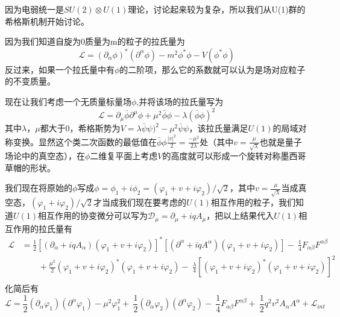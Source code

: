 因为电弱统一是$SU(2)\otimes U(1)$理论，讨论起来较为复杂，所以我们从U(1)群的希格斯机制开始讨论。

因为我们知道自旋为0质量为m的粒子的拉氏量为
\begin{equation}
    \mathcal{L}=(\partial_{\alpha} \phi)^*(\partial^{\alpha} \phi)-m^2\phi^*\phi -V(\phi^*\phi)
\end{equation}
反过来，如果一个拉氏量中有$\phi$的二阶项，那么它的系数就可以认为是场对应粒子的不变质量。

现在让我们考虑一个无质量标量场$\phi$,并将该场的拉氏量写为
\begin{equation}\label{eq:1.1}
    \mathcal{L}=\partial_{\mu}\bar{\phi}\partial^{\mu} \phi+\mu^2\bar{\phi}\phi -\lambda(\bar{\phi}\phi)^2
\end{equation}
其中$\lambda$，$\mu$都大于0，希格斯势为$V=\lambda\bar{\psi}\psi)^2-\mu^2\bar{\psi}\psi$，该拉氏量满足$U(1)$的局域对称变换。显然这个类二次函数的最低值在$\bar{\phi}\phi\frac{|v|^2}{2}=\frac{-\mu^2}{2\lambda}$处（其中$v=\frac{\mu}{\sqrt{\lambda}}$也就是量子场论中的真空态），在$\phi$二维复平面上考虑$V$的高度就可以形成一个旋转对称墨西哥草帽的形状。

我们现在将原始的$\phi$写成$\phi=\phi_1+i\phi_2=(\varphi_1+v+i\varphi_2)/\sqrt{2}$，其中$v=\frac{\mu}{\sqrt{\lambda}}$当成真空态，$(\varphi_1+i\varphi_2)/\sqrt{2}$才当成我们现在要考虑的$U(1)$相互作用的粒子，我们知道$U(1)$相互作用的协变微分可以写为$\mathcal{D}_\mu=\partial_{\mu}+iqA_{\mu}$，把以上结果代入$U(1)$相互作用的拉氏量有
\begin{equation}
\begin{aligned}\mathcal{L} & =\frac{1}{2}[(\partial_{\alpha}+iqA_{\alpha})(\varphi_1+v+i\varphi_2)]^*
[(\partial^{\alpha}+iqA^{\alpha})(\varphi_1+v+i\varphi_2)]
-\ \frac{1}{4}F_{\alpha\beta}F^{\alpha\beta} \\
 & \qquad+\frac{\mu^2}{2}(\varphi_1+v+i\varphi_2)^*(\varphi_1+v+i\varphi_2)
-\ \frac{\lambda}{4}[(\varphi_1+v+i\varphi_2)^*(\varphi_1+v+i\varphi_2)]^2 \\
\end{aligned}
\end{equation}
化简后有
\begin{equation}
    \mathcal{L}=\frac{1}{2}(\partial_{\alpha}\varphi_1)(\partial^{\alpha}\varphi_1)
-\mu^2\varphi_1^2+\ \frac{1}{2}(\partial_{\alpha}\varphi_2)(\partial^{\alpha}\varphi_2)-\ \frac{1}{4}F_{\alpha\beta}F^{\alpha\beta} +\ \frac{1}{2}q^2 v^2 A_{\alpha}A^{\alpha}+ \mathcal{L}_{int}
\end{equation}


